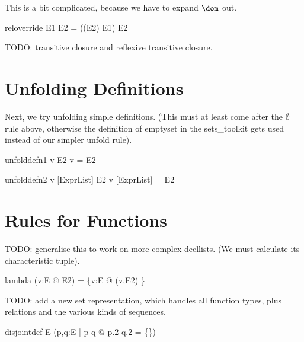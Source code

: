 \documentclass{article}
\begin{document}
This is a bit complicated, because we have to expand $\dom$ out.
\begin{zedrule}{reloverride}
   E1 \oplus E2 = ((\dom E2) \ndres E1) \cup E2
\end{zedrule}

TODO: transitive closure and reflexive transitive closure.


\section{Unfolding Definitions}

Next, we try unfolding simple definitions.
(This must at least come after the $\emptyset$ rule above,
otherwise the definition of emptyset in the sets\_toolkit
gets used instead of our simpler unfold rule).

\begin{zedrule}{unfolddefn1}
  v \hasDefn E2
\derives
   v = E2
\end{zedrule}

\begin{zedrule}{unfolddefn2}
  v [ExprList] \hasDefn E2
\derives
   v [ExprList] = E2
\end{zedrule}


\section{Rules for Functions}

TODO: generalise this to work on more complex decllists.
(We must calculate its characteristic tuple).
\begin{zedrule}{lambda}
   (\lambda v:E @ E2) = \{v:E @ (v,E2) \}
\end{zedrule}


TODO: add a new set representation, which handles all function types,
plus relations and the various kinds of sequences.

\begin{zedrule}{disjointdef}
   \disjoint E \iff (\forall p,q:E | p \neq q @ p.2 \cap q.2 = \{\})
\end{zedrule}
\end{document}
